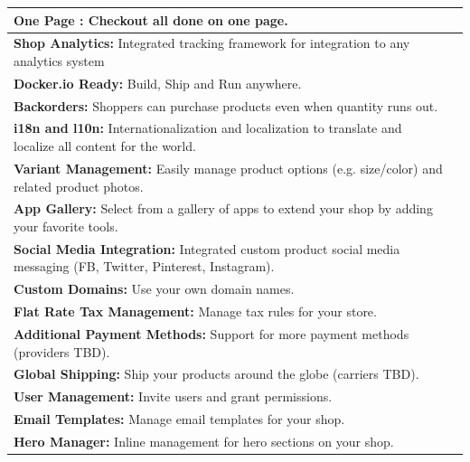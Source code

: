 \begin{table}[h!]
\begin{tabular}{ |L{0.6\paperwidth}|L{0.1\paperwidth}|}
\\ \hline
	\textbf{ One Page \checkout:} Checkout all done on one page.&
	
\\ \hline
	\textbf{ Shop Analytics:} Integrated tracking framework for integration to any analytics system&
	
\\ \hline
	\textbf{ Docker.io Ready:} Build, Ship and Run anywhere.&
	
\\ \hline
	 \textbf{ Backorders:} Shoppers can purchase products even when quantity runs out.&
	
\\ \hline
	\textbf{ i18n and l10n:} Internationalization and localization to translate and localize all content for the world.&
	
\\ \hline
	\textbf{ Variant Management:} Easily manage product options (e.g. size/color) and related product photos.&
	
\\ \hline
	\textbf{ App Gallery:} Select from a gallery of apps to extend your shop by adding your favorite tools.&
	
\\ \hline
	\textbf{ Social Media Integration:} Integrated custom product social media messaging (FB, Twitter, Pinterest, Instagram).&
	
\\ \hline
	\textbf{ Custom Domains:} Use your own domain names.&
	
\\ \hline
	\textbf{ Flat Rate Tax Management:} Manage tax rules for your store.&
	
\\ \hline
	\textbf{ Additional Payment Methods:} Support for more payment methods (providers TBD).&
	
\\ \hline
	\textbf{ Global Shipping:} Ship your products around the globe (carriers TBD).&
	
\\ \hline
	\textbf{ User Management:} Invite users and grant permissions.&
	
\\ \hline
	\textbf{ Email Templates:} Manage email templates for your shop.&
	
\\ \hline
	\textbf{ Hero Manager:} Inline management for hero sections on your shop.&
	

\end{tabular}
\end{table}
